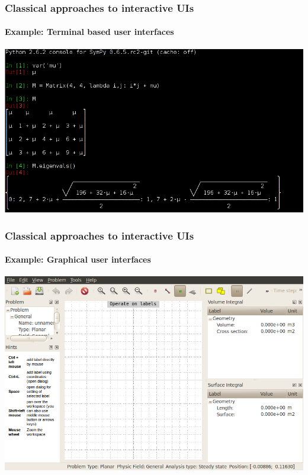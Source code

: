 \documentclass{beamer}
\begin{document}
\begin{frame}
    \frametitle{Classical approaches to interactive UIs}
    \framesubtitle{Example: Terminal based user interfaces}

    \begin{center}
        \includegraphics[scale=0.65]{images/sympy-unicode.png}
    \end{center}
\end{frame}

\begin{frame}
    \frametitle{Classical approaches to interactive UIs}
    \framesubtitle{Example: Graphical user interfaces}

    \begin{center}
        \includegraphics[scale=0.40]{images/agros2d-window.png}
    \end{center}
\end{frame}
\end{document}
